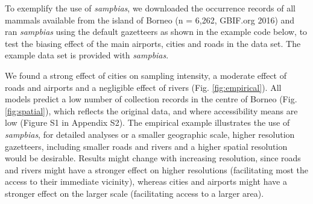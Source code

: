 \documentclass[
  12pt,
]{article}
\begin{document}
To exemplify the use of \emph{sampbias}, we downloaded the occurrence records of all mammals available from the island of Borneo (n = 6,262, GBIF.org 2016) and ran \emph{sampbias} using the default gazetteers as shown in the example code below, to test the biasing effect of the main airports, cities and roads in the data set. The example data set is provided with \emph{sampbias}.

We found a strong effect of cities on sampling intensity, a moderate effect of roads and airports and a negligible effect of rivers (Fig. \ref{fig:empirical}). All models predict a low number of collection records in the centre of Borneo (Fig. \ref{fig:spatial}), which reflects the original data, and where accessibility means are low (Figure S1 in Appendix S2). The empirical example illustrates the use of \emph{sampbias}, for detailed analyses or a smaller geographic scale, higher resolution gazetteers, including smaller roads and rivers and a higher spatial resolution would be desirable. Results might change with increasing resolution, since roads and rivers might have a stronger effect on higher resolutions (facilitating most the access to their immediate vicinity), whereas cities and airports might have a stronger effect on the larger scale (facilitating access to a larger area).
\end{document}

